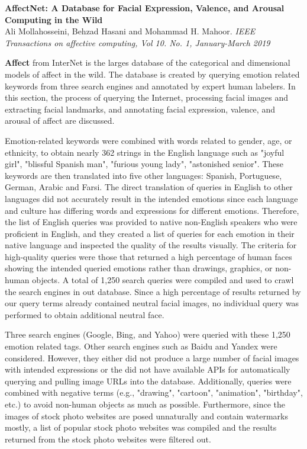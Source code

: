 




\textbf{\large AffectNet: A Database for Facial Expression, Valence, and Arousal Computing in the
Wild}\\
Ali Mollahosseini, Behzad Hasani and Mohammad H. Mahoor. \textit{IEEE Transactions on
affective computing, Vol 10. No. 1, January-March 2019}

\textbf{Affect} from InterNet is the larges database of the categorical and dimensional models of
affect in the wild. The database is created by querying emotion related keywords from three
search engines and annotated by expert human labelers. In this section, the process of querying the
Internet, processing facial images and extracting facial landmarks, and annotating facial
expression, valence, and arousal of affect are discussed.

Emotion-related keywords were combined with words related to gender, age, or ethnicity, to obtain
nearly 362 strings in the English language such as "joyful girl", "blissful Spanish man", "furious
young lady", "astonished senior". These keywords are then translated into five other languages:
Spanish, Portuguese, German, Arabic and Farsi. The direct translation of queries in English to
other languages did not accurately result in the intended emotions since each language and
culture has differing words and expressions for different emotions. Therefore, the list of
English queries was provided to native non-English speakers who were proficient in English,
and they created a list of queries for each emotion in their native language and inspected the
quality of the results visually. The criteria for high-quality queries were those that returned
a high percentage of human faces showing the intended queried emotions rather than drawings,
graphics, or non-human objects. A total of 1,250 search queries were compiled and used to crawl the
search engines in out database. Since a high percentage of results returned by our query terms
already contained neutral facial images, no individual query was performed to obtain additional
neutral face.

Three search engines (Google, Bing, and Yahoo) were queried with these 1,250 emotion related tags.
Other search engines such as Baidu and Yandex were considered. However, they either did not produce
a large number of facial images with intended expressions or the did not have available APIs for
automatically querying and pulling image URLs into the database. Additionally, queries were combined
with negative terms (e.g., "drawing", "cartoon", "animation", "birthday", etc.) to avoid non-human
objects as much as possible. Furthermore, since the images of stock photo websites are posed
unnaturally and contain watermarks mostly, a list of popular stock photo websites was compiled and
the results returned from the stock photo websites were filtered out.

